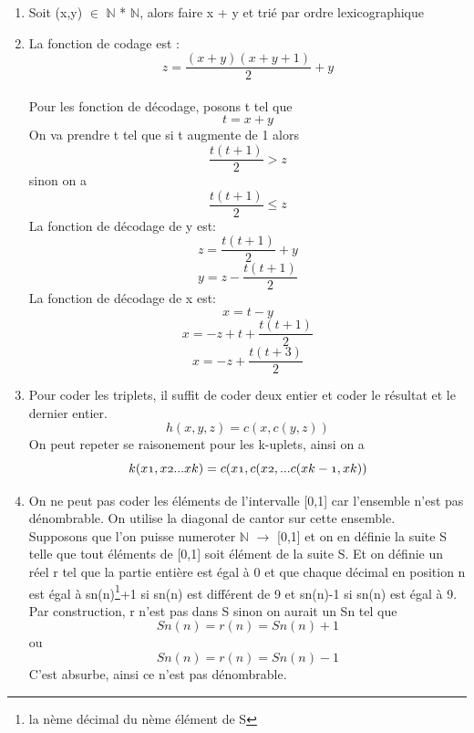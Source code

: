\documentclass[]{article}
\begin{document}
\begin{enumerate}
\item Soit (x,y) $\in$ $\mathbb{N}$ * $\mathbb{N}$, alors faire x + y et trié par ordre lexicographique
\item La fonction de codage est : \[z = \frac{(x+y)(x+y+1)}{2} + y\]\\
Pour les fonction de décodage, posons t tel que \[t = x + y\]
On va prendre t tel que si t augmente de 1 alors \[\frac{t(t+1)}{2} > z\] sinon on a \[\frac{t(t+1)}{2} \le z\]
La fonction de décodage de y est: \[z =\frac{t(t+1)}{2} + y\] \[y = z - \frac{t(t+1)}{2}\]
La fonction de décodage de x est: \[x = t - y\] \[x = -z + t + \frac{t(t+1)}{2}\] \[x = -z + \frac{t(t+3)}{2}\]
\item Pour coder les triplets, il suffit de coder deux entier et coder le résultat et le dernier entier. 
  \[h(x,y,z)=c(x , c(y,z))\]
On peut repeter se raisonement pour les k-uplets, ainsi on a 
\[k(x\oldstylenums{1},x\oldstylenums{2}... x\oldstylenums{k}) = c(x\oldstylenums{1} , c(x\oldstylenums{2} , ... c(x\oldstylenums{k-1},x\oldstylenums{k}))\]
\item On ne peut pas coder les éléments de l'intervalle [0,1] car l'ensemble n'est pas dénombrable. On utilise la diagonal de cantor sur cette ensemble.\\
Supposons que l'on puisse numeroter $\mathbb{N}$  $\rightarrow$ [0,1] et on en définie la suite S telle que tout éléments de [0,1] soit élément de la suite S.
Et on définie un réel r tel que la partie entière est égal à 0 et que chaque décimal en position n est égal à sn(n)\footnote{la nème décimal du nème élément de S}+1 si sn(n) est différent de 9 et sn(n)-1 si sn(n) est égal à 9.\\
Par construction, r n'est pas dans S sinon on aurait un Sn tel que \[Sn(n)=r(n)=Sn(n)+1\] ou \[Sn(n)=r(n)=Sn(n)-1\] C'est absurbe, ainsi ce n'est pas dénombrable. 
   
  
\end{enumerate}
\end{document}
